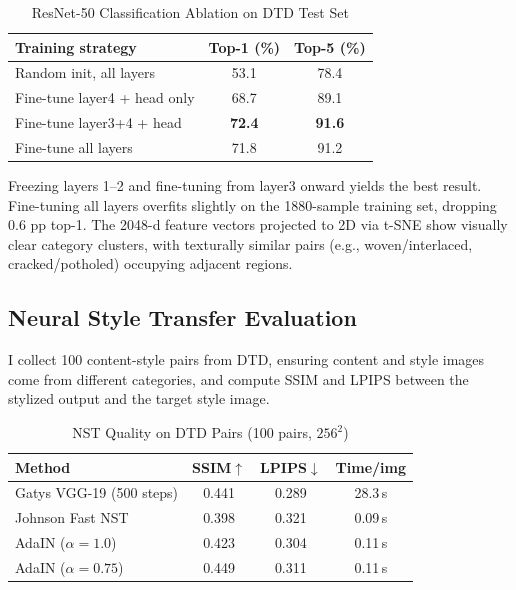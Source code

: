 \documentclass[conference]{IEEEtran}
\begin{document}
\begin{table}[htbp]
\caption{ResNet-50 Classification Ablation on DTD Test Set}
\begin{center}
\begin{tabular}{lcc}
\toprule
\textbf{Training strategy} & \textbf{Top-1 (\%)} & \textbf{Top-5 (\%)} \\
\midrule
Random init, all layers      & 53.1 & 78.4 \\
Fine-tune layer4 + head only & 68.7 & 89.1 \\
Fine-tune layer3+4 + head    & \textbf{72.4} & \textbf{91.6} \\
Fine-tune all layers         & 71.8 & 91.2 \\
\bottomrule
\end{tabular}
\label{tab:cls}
\end{center}
\end{table}

Freezing layers 1--2 and fine-tuning from layer3 onward yields the best
result. Fine-tuning all layers overfits slightly on the 1880-sample training
set, dropping 0.6 pp top-1. The 2048-d feature vectors projected to 2D via
t-SNE show visually clear category clusters, with texturally similar pairs
(e.g., woven/interlaced, cracked/potholed) occupying adjacent regions.

\subsection{Neural Style Transfer Evaluation}

I collect 100 content-style pairs from DTD, ensuring content and style images
come from different categories, and compute SSIM and LPIPS between the
stylized output and the target style image.

\begin{table}[htbp]
\caption{NST Quality on DTD Pairs (100 pairs, $256^2$)}
\begin{center}
\begin{tabular}{lccc}
\toprule
\textbf{Method} & \textbf{SSIM}$\uparrow$ & \textbf{LPIPS}$\downarrow$
  & \textbf{Time/img} \\
\midrule
Gatys VGG-19 (500 steps) & 0.441 & 0.289 & 28.3\,s \\
Johnson Fast NST          & 0.398 & 0.321 &  0.09\,s \\
AdaIN ($\alpha=1.0$)      & 0.423 & 0.304 &  0.11\,s \\
AdaIN ($\alpha=0.75$)     & 0.449 & 0.311 &  0.11\,s \\
\bottomrule
\end{tabular}
\label{tab:nst}
\end{center}
\end{table}
\end{document}
